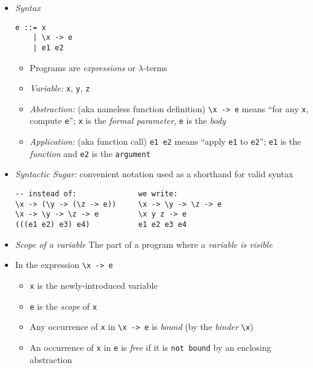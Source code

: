 \documentclass[landscape,8pt]{extarticle}
\newcommand{\code}{\lstinline}
\begin{document}
\footnotesize
\begin{multicols}{3}
    \setlength{\premulticols}{1pt}
    \setlength{\postmulticols}{1pt}
    \setlength{\multicolsep}{1pt}
    \setlength{\columnsep}{2pt}
    \begin{itemize}
        \item \emph{Syntax}
              \begin{lstlisting}
e ::= x
    | \x -> e
    | e1 e2
        \end{lstlisting}
              \begin{itemize}
                  \item Programs are \emph{expressions} or $\lambda$-terms
                  \item \emph{Variable:} \code{x}, \code{y}, \code{z}
                  \item \emph{Abstraction:} (aka nameless function definition) \code{\x -> e} means ``for any \code{x}, compute \code{e}''; \code{x} is the \emph{formal parameter}, \code{e} is the \emph{body}
                  \item \emph{Application:} (aka function call) \code{e1 e2} means ``apply \code{e1} to \code{e2}''; \code{e1} is the \emph{function} and \code{e2} is the \code{argument}
              \end{itemize}
        \item \emph{Syntactic Sugar:} convenient notation used as a shorthand for valid syntax
              \begin{lstlisting}
-- instead of:              we write:
\x -> (\y -> (\z -> e))     \x -> \y -> \z -> e
\x -> \y -> \z -> e         \x y z -> e
(((e1 e2) e3) e4)           e1 e2 e3 e4
        \end{lstlisting}
        \item \emph{Scope of a variable} The part of a program where a \emph{variable is visible}
        \item In the expression \code{\x -> e}
              \begin{itemize}
                  \item \code{x} is the newly-introduced variable
                  \item \code{e} is the \emph{scope} of \code{x}
                  \item Any occurrence of \code{x} in \code{\x -> e} is \emph{bound} (by the \emph{binder} \code{\x})
                  \item An occurrence of \code{x} in \code{e} is \emph{free} if it is \code{not bound} by an enclosing abstraction

\end{itemize}
\end{itemize}
\end{multicols}
\end{document}
